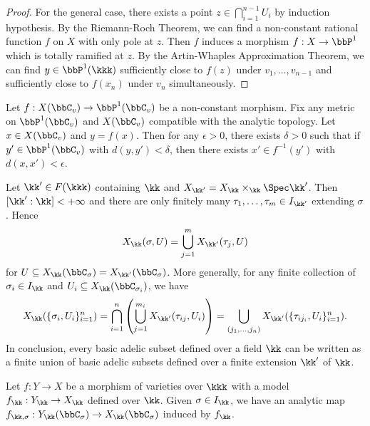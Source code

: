 \begin{proof}
        For the general case, there exists a point \(z \in \bigcap_{i=1}^{n-1} U_i\) by induction hypothesis.
        By the Riemann-Roch Theorem, we can find a non-constant rational function \(f\) on \(X\) with only pole at \(z\).
        Then \(f\) induces a morphism \(f: X \to \bbP^1\) which is totally ramified at \(z\).
        By the Artin-Whaples Approximation Theorem, we can find \(y \in \bbP^1(\kkk)\) sufficiently close to \(f(z)\) under \(v_1,\ldots,v_{n-1}\) and sufficiently close to \(f(x_n)\) under \(v_n\) simultaneously.

    \end{proof}

    \begin{lemma}\label{lem:image_sufficiently_closed_implies_preimage_sufficiently_closed}
        Let \(f: X(\bbC_v) \to \bbP^1(\bbC_v)\) be a non-constant morphism.
        Fix any metric on \(\bbP^1(\bbC_v)\) and \(X(\bbC_v)\) compatible with the analytic topology.
        Let \(x \in X(\bbC_v)\) and \(y = f(x)\).
        Then for any \(\epsilon > 0\), there exists \(\delta > 0\) such that if \(y' \in \bbP^1(\bbC_v)\) with \(d(y,y') < \delta\), then there exists \(x' \in f^{-1}(y')\) with \(d(x,x') < \epsilon\).
    \end{lemma}


    Let \(\kk' \in F(\kkk)\) containing \(\kk\) and \(X_{\kk'} = X_\kk \times_{\kk} \Spec \kk'\).
    Then \([\kk':\kk] < +\infty\) and there are only finitely many \(\tau_1,\ldots,\tau_m \in I_{\kk'}\) extending \(\sigma\).
    Hence
    \[ X_\kk(\sigma,U) = \bigcup_{j=1}^m X_{\kk'}(\tau_j,U) \]
    for \(U \subseteq X_{\kk}(\bbC_\sigma) = X_{\kk'}(\bbC_\sigma)\).
    More generally, for any finite collection of \(\sigma_i \in I_\kk\) and \(U_i \subseteq X_{\kk}(\bbC_{\sigma_i})\), we have
    \[ X_\kk(\{\sigma_i,U_i\}_{i=1}^n) = \bigcap_{i=1}^n \left( \bigcup_{j=1}^{m_i} X_{\kk'}(\tau_{ij},U_i) \right) = \bigcup_{(j_1,\ldots,j_n)} X_{\kk'}(\{\tau_{ij_i},U_i\}_{i=1}^n). \]
    In conclusion, every basic adelic subset defined over a field \(\kk\) can be written as a finite union of basic adelic subsets defined over a finite extension \(\kk'\) of \(\kk\).

    Let \(f: Y \to X\) be a morphism of varieties over \(\kkk\) with a model \(f_\kk: Y_\kk \to X_\kk\) defined over \(\kk\).
    Given \(\sigma \in I_\kk\), we have an analytic map \(f_{\kk,\sigma}: Y_{\kk}(\bbC_\sigma) \to X_{\kk}(\bbC_\sigma)\) induced by \(f_\kk\).
    \Yang{}

